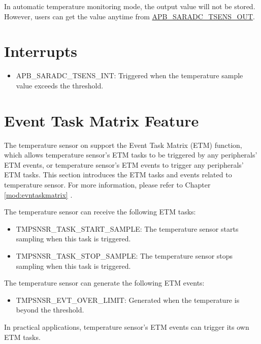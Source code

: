 \documentclass[main\_\_EN.tex]{subfiles}
\begin{document}
In automatic temperature monitoring mode, the output value will not be stored. However, users can get the value anytime from \hyperref[fielddesc:APBSARADCTSENSOUT]{APB\_SARADC\_TSENS\_OUT}.

\section{Interrupts}
\begin{itemize}
    \item \label{int:APBSARADCTSENSINT} APB\_SARADC\_TSENS\_INT: Triggered when the temperature sample value exceeds the threshold.
\end{itemize}


\section{Event Task Matrix Feature}
\label{sec:tmpsen-etm-func}

The temperature sensor on \chipname{} support the Event Task Matrix (ETM) function, which allows temperature sensor's ETM tasks to be triggered by any peripherals' ETM events, or temperature sensor's ETM events to trigger any peripherals' ETM tasks. This section introduces the ETM tasks and events related to temperature sensor. For more information, please refer to Chapter \ref{mod:evntaskmatrix} .

The temperature sensor can receive the following ETM tasks:

\begin{itemize}
    \item TMPSNSR\_TASK\_START\_SAMPLE: The temperature sensor starts sampling when this task is triggered.
    \item TMPSNSR\_TASK\_STOP\_SAMPLE: The temperature sensor stops sampling when this task is triggered.
\end{itemize}

The temperature sensor can generate the following ETM events:

\begin{itemize}
    \item TMPSNSR\_EVT\_OVER\_LIMIT: Generated when the temperature is beyond the threshold.
\end{itemize}

In practical applications, temperature sensor's ETM events can trigger its own ETM tasks.
\end{document}

